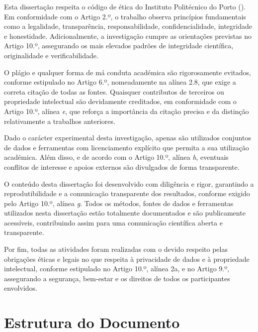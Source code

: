 Esta dissertação respeita o código de ética do Instituto Politécnico do Porto (\cite{codigo_2020}). Em conformidade com o Artigo 2.º, o trabalho observa princípios fundamentais como a legalidade, transparência, responsabilidade, confidencialidade, integridade e honestidade. Adicionalmente, a investigação cumpre as orientações previstas no Artigo 10.º, assegurando os mais elevados padrões de integridade científica, originalidade e verificabilidade.

O plágio e qualquer forma de má conduta académica são rigorosamente evitados, conforme estipulado no Artigo 6.º, nomeadamente na alínea 2.8, que exige a correta citação de todas as fontes. Quaisquer contributos de terceiros ou propriedade intelectual são devidamente creditados, em conformidade com o Artigo 10.º, alínea \textit{e}, que reforça a importância da citação precisa e da distinção relativamente a trabalhos anteriores.

Dado o carácter experimental desta investigação, apenas são utilizados conjuntos de dados e ferramentas com licenciamento explícito que permita a sua utilização académica. Além disso, e de acordo com o Artigo 10.º, alínea \textit{h}, eventuais conflitos de interesse e apoios externos são divulgados de forma transparente.

O conteúdo desta dissertação foi desenvolvido com diligência e rigor, garantindo a reprodutibilidade e a comunicação transparente dos resultados, conforme exigido pelo Artigo 10.º, alínea \textit{g}. Todos os métodos, fontes de dados e ferramentas utilizados nesta dissertação estão totalmente documentados e são publicamente acessíveis, contribuindo assim para uma comunicação científica aberta e transparente.

Por fim, todas as atividades foram realizadas com o devido respeito pelas obrigações éticas e legais no que respeita à privacidade de dados e à propriedade intelectual, conforme estipulado no Artigo 10.º, alínea 2a, e no Artigo 9.º, assegurando a segurança, bem-estar e os direitos de todos os participantes envolvidos.

\section{Estrutura do Documento}


